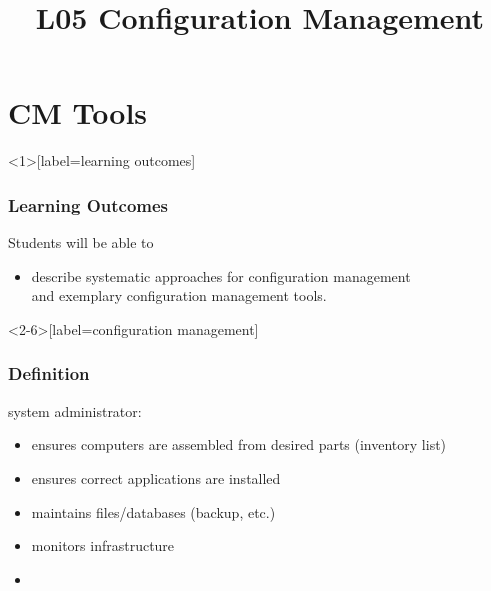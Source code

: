 

\title{L05 Configuration Management}



\section{CM Tools}

\begin{frame}<1>[label=learning outcomes]
	\frametitle{Learning Outcomes}
	Students will be able to
	\begin{itemize}
	\item describe systematic approaches for configuration management \\ and exemplary configuration management tools.

	\end{itemize}
\end{frame}

\begin{frame}<2-6>[label=configuration management]
	\frametitle{Definition}


	\vspace{1cm}
	system administrator:
	\pause

	\begin{itemize}[<+-| alert@+>]
	\item ensures computers are assembled from desired parts (inventory list)
	\item ensures correct applications are installed
	\item maintains files/databases (backup, etc.)
	\item monitors infrastructure
	\item {}
	\end{itemize}
\end{frame}

